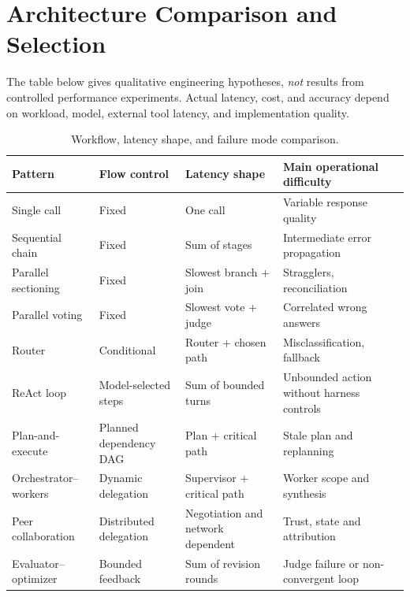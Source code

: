 
\section{Architecture Comparison and Selection}
The table below gives qualitative engineering hypotheses, \emph{not} results from controlled performance experiments. Actual latency, cost, and accuracy depend on workload, model, external tool latency, and implementation quality.

\begin{table}[htbp]\small\centering
\begin{tabularx}{\linewidth}{@{}p{26mm}p{22mm}p{28mm}Y@{}}\toprule
\textbf{Pattern} & \textbf{Flow control} & \textbf{Latency shape} & \textbf{Main operational difficulty}\\\midrule
Single call & Fixed & One call & Variable response quality\\
Sequential chain & Fixed & Sum of stages & Intermediate error propagation\\
Parallel sectioning & Fixed & Slowest branch + join & Stragglers, reconciliation\\
Parallel voting & Fixed & Slowest vote + judge & Correlated wrong answers\\
Router & Conditional & Router + chosen path & Misclassification, fallback\\
ReAct loop & Model-selected steps & Sum of bounded turns & Unbounded action without harness controls\\
Plan-and-execute & Planned dependency DAG & Plan + critical path & Stale plan and replanning\\
Orchestrator--workers & Dynamic delegation & Supervisor + critical path & Worker scope and synthesis\\
Peer collaboration & Distributed delegation & Negotiation and network dependent & Trust, state and attribution\\
Evaluator--optimizer & Bounded feedback & Sum of revision rounds & Judge failure or non-convergent loop\\\bottomrule
\end{tabularx}
\caption{Workflow, latency shape, and failure mode comparison.}
\label{tab:comparison}
\end{table}

